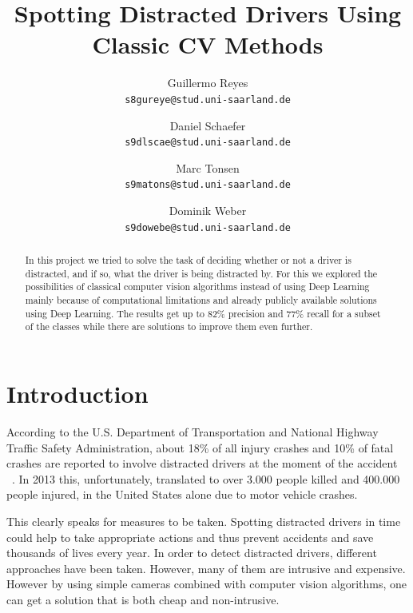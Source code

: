 \documentclass[10pt,twocolumn,letterpaper]{article}
\begin{document}
\title{Spotting Distracted Drivers Using Classic CV Methods}

\author{Guillermo Reyes\\
{\tt\small s8gureye@stud.uni-saarland.de}
\and
Daniel Schaefer\\
{\tt\small s9dlscae@stud.uni-saarland.de}
\and
Marc Tonsen\\
{\tt\small s9matons@stud.uni-saarland.de}
\and
Dominik Weber\\
{\tt\small s9dowebe@stud.uni-saarland.de}
}

\maketitle

\begin{abstract}
   In this project we tried to solve the task of deciding whether or not a driver is distracted, and if so, what the driver is being distracted by. For this we explored the possibilities of classical computer vision algorithms instead of using Deep Learning mainly because of computational limitations and already publicly available solutions using Deep Learning. The results get up to 82\% precision and 77\% recall for a subset of the classes while there are solutions to improve them even further.
\end{abstract}


\section{Introduction}


According to the U.S. Department of Transportation and National Highway Traffic Safety Administration, about 18\% of all injury crashes and 10\% of fatal crashes are reported to involve distracted drivers at the moment of the accident ~\cite{knuthwebsite}. In 2013 this, unfortunately, translated to over 3.000 people killed and 400.000 people injured, in the United States alone due to motor vehicle crashes.

This clearly speaks for measures to be taken. Spotting distracted drivers in time could help to take appropriate actions and thus prevent accidents and save thousands of lives every year. In order to detect distracted drivers, different approaches have been taken. However, many of them are intrusive and expensive. However by using simple cameras combined with computer vision algorithms, one can get a solution that is both cheap and non-intrusive.\\
\end{document}
